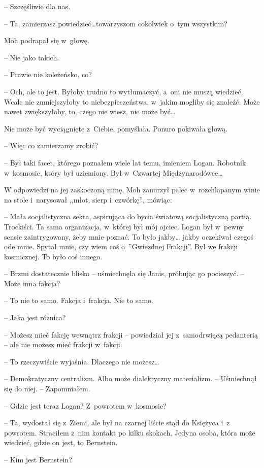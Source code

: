\documentclass[oneside,polish,11pt,sfheadings]{mwbk}
\begin{document}
-- Szczęśliwie dla nas.

-- Ta, zamierzasz powiedzieć\ldots towarzyszom cokolwiek o~tym wszystkim?

Moh podrapał się w~głowę. 

-- Nie jako takich.

-- Prawie nie koleżeńsko, co?

-- Och, ale to jest. Byłoby trudno to wytłumaczyć, a~oni nie muszą
wiedzieć. Wcale nie zmniejszyłoby to niebezpieczeństwa, w~jakim mogliby
się znaleźć. Może nawet zwiększyłoby, to, czego nie wiesz, nie może
być\ldots

Nie może być wyciągnięte z~Ciebie, pomyślała. Ponuro pokiwała głową.

-- Więc co zamierzamy zrobić?

-- Był taki facet, którego poznałem wiele lat temu, imieniem Logan.
Robotnik w~kosmosie, który był uziemiony. Był w~Czwartej
Międzynarodówce\ldots

W odpowiedzi na jej zaskoczoną minę, Moh zanurzył palec w~rozchlapanym
winie na stole i~narysował ,,młot, sierp i~czwórkę'', mówiąc: 

-- Mała
socjalistyczna sekta, aspirująca do bycia światową socjalistyczną
partią. Trockiści. Ta sama organizacja, w~której był mój ojciec. Logan
był w~pewny sensie zaintrygowany, żeby mnie poznać. To było jakby\ldots
jakby oczekiwał czegoś ode mnie. Spytał mnie, czy wiem coś o~''Gwiezdnej
Frakcji''. Był we frakcji kosmicznej. To było coś innego.

-- Brzmi dostatecznie blisko -- uśmiechnęła się Janis, próbując go
pocieszyć. -- Może inna fakcja?

-- To nie to samo. Fakcja i~frakcja. Nie to samo.

-- Jaka jest różnica?

-- Możesz mieć fakcję wewnątrz frakcji -- powiedział jej z~samodrwiącą
pedanterią -- ale nie możesz mieć frakcji w~fakcji.

-- To rzeczywiście wyjaśnia. Dlaczego nie możesz\ldots

-- Demokratyczny centralizm. Albo może dialektyczny materializm. -- Uśmiechnął się do niej. -- Zapomniałem.

-- Gdzie jest teraz Logan? Z~powrotem w~kosmosie?

-- Ta, wydostał się z~Ziemi, ale był na czarnej liście stąd do Księżyca i~z powrotem. Straciłem z~nim kontakt po kilku skokach. Jedyna osoba,
która może wiedzieć, gdzie on jest, to Bernstein.

-- Kim jest Bernstein?
\end{document}
